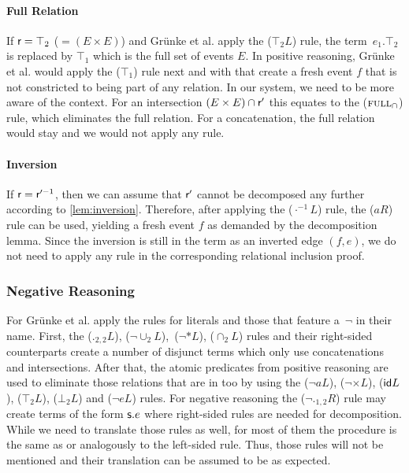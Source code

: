 \documentclass[a4paper,twoside,12pt, english]{article}
\begin{document}
\paragraph{Full Relation} If $\textsf{\upshape r} = \top_2$ ($= (E \times E)$) and Grünke et al. apply the ($\top_2L$) rule, the term~$e_1.\top_2$ is replaced by $\top_1$ which is the full set of events $E$. In positive reasoning, Grünke et al. would apply the ($\top_1$) rule next and with that create a fresh event $f$ that is not constricted to being part of any relation.
In our system, we need to be more aware of the context. For an intersection $(E\times E) \cap \textsf{\upshape r}'$ this equates to the ($\textsc{full}_\cap$) rule, which eliminates the full relation.
For a concatenation, the full relation would stay and we would not apply any rule.

\paragraph{Inversion} If $\textsf{\upshape r} = \textsf{\upshape r}'^{-1}$, then we can assume that $\textsf{\upshape r}'$ cannot be decomposed any further according to \cref{lem:inversion}. Therefore, after applying the ($\cdot^{-1}L$) rule, the ($aR$) rule can be used, yielding a fresh event $f$ as demanded by the decomposition lemma.
Since the inversion is still in the term as an inverted edge $(f,e)$, we do not need to apply any rule in the corresponding relational inclusion proof.

\subsubsection{Negative Reasoning}\label{sec:negreasoning}
For \rels{} Grünke et al. apply the rules for literals and those that feature a~$\neg$ in their name. First, the ($._{2,2}L$), ($\neg {\cup_2}L$),~($\neg * L$), ($\cap_2L$) rules and their right-sided counterparts create a number of disjunct terms which only use concatenations and intersections. After that, the atomic predicates from positive reasoning are used to eliminate those relations that are in \relr{} too by using the ($\neg aL$), ($\neg{\times}L$), ($\textsf{\upshape id} L$), ($\top_2L$), ($\bot_2L$) and ($\neg eL$) rules. For negative reasoning the ($\neg ._{1,2}R$) rule may create terms of the form $\textsf{\upshape s}.e$ where right-sided rules are needed for decomposition. While we need to translate those rules as well, for most of them the procedure is the same as or analogously to the left-sided rule. Thus, those rules will not be mentioned and their translation can be assumed to be as expected.
\end{document}
